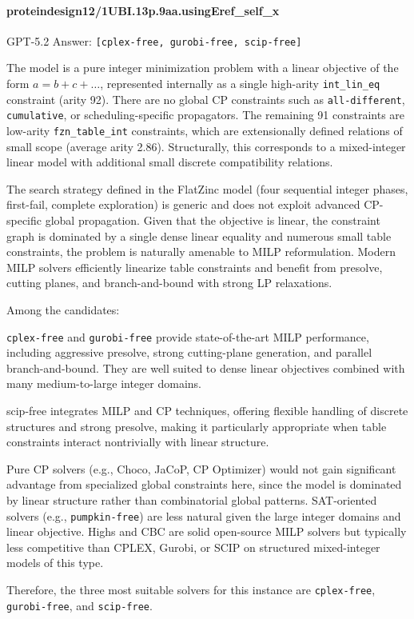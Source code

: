 \documentclass[../../main]{subfiles}
\begin{document}
\paragraph{proteindesign12/1UBI.13p.9aa.usingEref\_self\_x}
\begin{floatingdefinition}{GPT-5.2 Answer:}
    \texttt{[cplex-free, gurobi-free, scip-free]}

    The model is a pure integer minimization problem with a linear objective of the form 
    $a=b+c+\dots$, represented internally as a single high-arity \texttt{int\_lin\_eq} constraint (arity 92). There are no global CP constraints such as \texttt{all-different}, \texttt{cumulative}, or scheduling-specific propagators. The remaining 91 constraints are low-arity \texttt{fzn\_table\_int} constraints, which are extensionally defined relations of small scope (average arity 2.86). Structurally, this corresponds to a mixed-integer linear model with additional small discrete compatibility relations.

    The search strategy defined in the FlatZinc model (four sequential integer phases, first-fail, complete exploration) is generic and does not exploit advanced CP-specific global propagation. Given that the objective is linear, the constraint graph is dominated by a single dense linear equality and numerous small table constraints, the problem is naturally amenable to MILP reformulation. Modern MILP solvers efficiently linearize table constraints and benefit from presolve, cutting planes, and branch-and-bound with strong LP relaxations.

    Among the candidates:

    \texttt{cplex-free} and \texttt{gurobi-free} provide state-of-the-art MILP performance, including aggressive presolve, strong cutting-plane generation, and parallel branch-and-bound. They are well suited to dense linear objectives combined with many medium-to-large integer domains.

    scip-free integrates MILP and CP techniques, offering flexible handling of discrete structures and strong presolve, making it particularly appropriate when table constraints interact nontrivially with linear structure.

    Pure CP solvers (e.g., Choco, JaCoP, CP Optimizer) would not gain significant advantage from specialized global constraints here, since the model is dominated by linear structure rather than combinatorial global patterns. SAT-oriented solvers (e.g., \texttt{pumpkin-free}) are less natural given the large integer domains and linear objective. Highs and CBC are solid open-source MILP solvers but typically less competitive than CPLEX, Gurobi, or SCIP on structured mixed-integer models of this type.

    Therefore, the three most suitable solvers for this instance are \texttt{cplex-free}, \texttt{gurobi-free}, and \texttt{scip-free}. 
\end{floatingdefinition}
\end{document}
